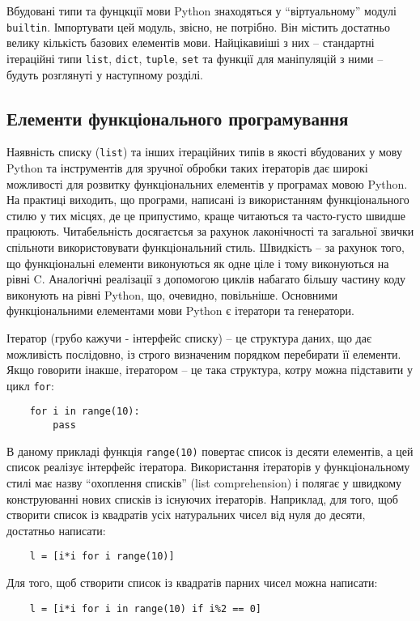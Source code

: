 \documentclass[a4paper, 12pt, onsedie]{article}
\begin{document}
    Вбудовані типи та фунцкції мови Python знаходяться у ``віртуальному'' модулі
    \texttt{ \textunderscore \textunderscore builtin\textunderscore \textunderscore }. Імпортувати цей
    модуль, звісно, не потрібно. Він містить достатньо велику кількість 
    базових елементів мови. Найцікавиіші з них -- стандартні ітераційні типи
    \texttt{list}, \texttt{dict}, \texttt{tuple}, \texttt{set} та функції для 
    маніпуляцій з ними -- будуть розглянуті у наступному розділі. 

\subsection{Елементи функціонального програмування}
    Наявність списку (\texttt{list}) та інших ітераційних типів в якості вбудованих
    у мову Python та інструментів для зручної обробки таких ітераторів дає широкі можливості
    для розвитку функціональних елементів у програмах мовою Python. На практиці виходить, що
    програми, написані із використанням функціонального стилю у тих місцях, де це припустимо,
    краще читаються та часто-густо швидше працюють. Читабельність досягаєтсья за рахунок
    лаконічності та загальної звички спільноти використовувати функціональний стиль. Швидкість
    -- за рахунок того, що функціональні елементи виконуються як одне ціле і тому виконуються
    на рівні C. Аналогічні реалізації з допомогою циклів набагато більшу частину коду
    виконують на рівні Python, що, очевидно, повільніше. Основними функціональними елементами
    мови Python є ітератори та генератори.

    Ітератор (грубо кажучи - інтерфейс списку) -- це структура даних, що дає можливість 
    послідовно, із строго визначеним порядком перебирати її елементи. Якщо говорити інакше,
    ітератором -- це така структура, котру можна підставити у цикл \texttt{for}:

    \begin{verbatim}
    for i in range(10):
        pass
    \end{verbatim}
    В даному прикладі функція \texttt{range(10)} повертає список із десяти елементів, а цей
    список реалізує інтерфейс ітератора. Використання ітераторів у функціональному стилі має
    назву ``охоплення списків'' (list comprehension) і полягає у швидкому конструюванні нових
    списків із існуючих ітераторів. Наприклад, для того, щоб створити список із квадратів 
    усіх натуральних чисел від нуля до десяти, достатньо написати:

    \begin{verbatim}
    l = [i*i for i range(10)]
    \end{verbatim}
    Для того, щоб створити список із квадратів парних чисел можна написати:
    \begin{verbatim}
    l = [i*i for i in range(10) if i%2 == 0]
    \end{verbatim}
\end{document}
